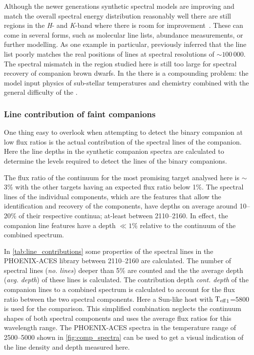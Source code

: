 
Although the newer generations synthetic spectral models are improving and match the overall spectral energy distribution reasonably well there are still regions in the \emph{H}- and \emph{K}-band where there is room for improvement~\citet{rajpurohit_spectral_2016}.
These can come in several forms, such as molecular line lists, abundance measurements, or further modelling.
As one example in particular, \citet{rajpurohit_spectral_2016} previously inferred that the  line list poorly matches the real positions of  lines at spectral resolutions of \(\sim100\,000\).
The spectral mismatch in the region studied here is still too large for spectral recovery of companion brown dwarfs.
In the \nir{} there is a compounding problem: the model input physics of sub-stellar temperatures and chemistry combined with the general difficulty of the \nir{}.

\subsubsection{Line contribution of faint companions}
\label{subsubsec:line_contributions}
One thing easy to overlook when attempting to detect the binary companion at low flux ratios is the actual contribution of the spectral lines of the companion.
Here the line depths in the synthetic companion spectra are calculated to determine the \snr{} levels required to detect the lines of the binary companions.

The flux ratio of the continuum for the most promising target analysed here is \FtwoFone{}\(\sim\)3\% with the other targets having an expected flux ratio below 1\%.
The spectral lines of the individual components, which are the features that allow the identification and recovery of the components, have depths on average around 10--20\% of their respective continua; at-least between 2110--2160\nm{}.
In effect, the companion line features have a depth \(\ll 1\%\) relative to the continuum of the combined spectrum.

In \cref{tab:line_contributions} some properties of the spectral lines in the {PHOENIX-ACES} library between 2110--2160\nm{} are calculated.
The number of spectral lines (\emph{no. lines}) deeper than 5\% are counted and the the average depth (\emph{avg. depth}) of these lines is calculated.
The contribution depth \emph{cont. depth} of the companion lines to a combined spectrum is calculated to account for the flux ratio between the two spectral components.
Here a Sun-like host with \({\textrm{T}_{\mathrm{eff}}}_{1}\)=5800\K{} is used for the comparison.
This simplified combination neglects the continuum shapes of both spectral components and uses the average flux ratios for this wavelength range.
The {PHOENIX-ACES} spectra in the temperature range of 2500--5000\K{} shown in \cref{fig:comp_spectra} can be used to get a visual indication of the line density and depth measured here.

